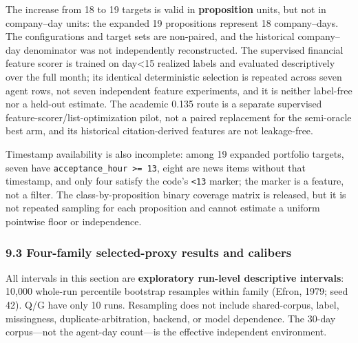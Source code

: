 \documentclass[
  11pt]{article}
\begin{document}
The increase from 18 to 19 targets is valid in \textbf{proposition}
units, but not in company--day units: the expanded 19 propositions
represent 18 company--days. The configurations and target sets are
non-paired, and the historical company--day denominator was not
independently reconstructed. The supervised financial feature scorer is
trained on day\textless15 realized labels and evaluated descriptively
over the full month; its identical deterministic selection is repeated
across seven agent rows, not seven independent feature experiments, and
it is neither label-free nor a held-out estimate. The academic 0.135
route is a separate supervised feature-scorer/list-optimization pilot,
not a paired replacement for the semi-oracle best arm, and its
historical citation-derived features are not leakage-free.

Timestamp availability is also incomplete: among 19 expanded portfolio
targets, seven have \texttt{acceptance\_hour\ \textgreater{}=\ 13},
eight are news items without that timestamp, and only four satisfy the
code's \texttt{\textless{}13} marker; the marker is a feature, not a
filter. The class-by-proposition binary coverage matrix is released, but
it is not repeated sampling for each proposition and cannot estimate a
uniform pointwise floor or independence.

\subsubsection{9.3 Four-family selected-proxy results and
calibers}\label{four-family-selected-proxy-results-and-calibers}

All intervals in this section are \textbf{exploratory run-level
descriptive intervals}: 10,000 whole-run percentile bootstrap resamples
within family (Efron, 1979; seed 42). Q/G have only 10 runs. Resampling
does not include shared-corpus, label, missingness,
duplicate-arbitration, backend, or model dependence. The 30-day
corpus---not the agent-day count---is the effective independent
environment.
\end{document}
